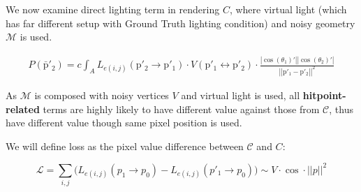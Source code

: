 We now examine direct lighting term in rendering $C$, where virtual light (which has far different setup with Ground Truth lighting condition) and noisy geometry $\mathcal{M}$ is used.



\begin{align}
    \mathit{P}\left(\bar{\mathrm{p}}'_2\right) = c\int_A L_{e(i,j)}(\mathrm{p}'_2\rightarrow \mathrm{p}'_1) \cdot V(\mathrm{p}'_1 \leftrightarrow \mathrm{p}'_2) \cdot \frac{\left|\cos(\theta_1)'\right|\left|\cos(\theta_2)'\right|}{\left|\left|\mathrm{p}'_1-\mathrm{p}'_2\right|\right|^2} \nonumber
    \label{LTE_path_integral_direct_lighting_SLAM}
\end{align}

As $\mathcal{M}$ is composed with noisy vertices $V$ and virtual light is used, all \textbf{hitpoint-related} terms are highly likely to have different value against those from $\mathcal{C}$, thus have different value though same pixel position is used.

We will define loss as the pixel value difference between $\mathcal{C}$ and $C$:

\begin{equation}
    \mathcal{L}=\sum_{i,j} \Big( L_{e(i,j)}(p_1 \rightarrow p_0)-L_{e(i,j)}(p'_1 \rightarrow p_0) \Big) \sim V \cdot \cos \cdot||p||^2
\end{equation}

